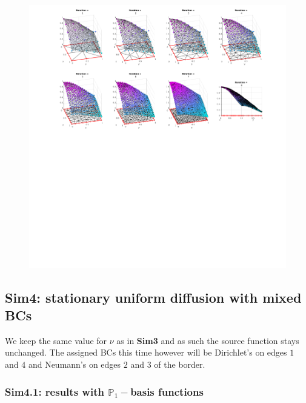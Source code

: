 \documentclass[12pt,openany,twoside,a4paper]{article}
\begin{document}
\begin{figure}[H]
    \centering
    \includegraphics[keepaspectratio,height=0.675\textheight]{sim3.2.png}
    \label{sim3.2}
\end{figure}

\newpage
\subsection{Sim4: stationary uniform diffusion with mixed BCs}
We keep the same value for $\nu$ as in \textbf{Sim3} and as such the source function stays unchanged. The assigned BCs this time however will be Dirichlet's on edges $1$ and $4$ and Neumann's on edges $2$ and $3$ of the border.

\subsubsection{Sim4.1: results with $\mathbb{P}_1-$basis functions}
\end{document}
